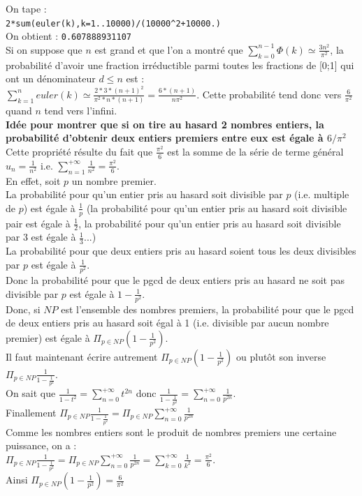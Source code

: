 \documentclass[a4paper,11pt]{book}
\begin{document}
\begin{enumerate}
On tape :\\
{\tt 2*sum(euler(k),k=1..10000)/(10000\verb|^|2+10000.)}\\
On obtient :
{\tt 0.607888931107}\\
Si on suppose que $n$ est grand et que l'on a montr\'e que 
$\sum_{k=0}^{n-1}\Phi(k)\simeq \frac{3n^2}{\pi^2}$, la probabilit\'e d'avoir une
fraction irr\'eductible parmi toutes 
les fractions de [0;1] qui ont un d\'enominateur $d\leq n$ est :\\
$\sum_{k=1}^n euler(k)\simeq \frac{2*3*(n+1)^2}{\pi^2*n*(n+1)}=\frac{6*(n+1)}{n\pi^2}$.
Cette probabilit\'e tend donc vers $\frac{6}{\pi^2}$ quand $n$ tend vers 
l'infini.\\
{\bf Id\'ee pour montrer que si on tire au hasard 2 nombres entiers, la 
probabilit\'e d'obtenir deux entiers premiers entre eux est \'egale \`a 
$6/\pi^2$}\\
Cette propri\'et\'e r\'esulte du fait que $\frac{\pi^2}{6}$ est la somme de la 
s\'erie de terme g\'en\'eral $u_n=\frac{1}{n^2}$ i.e.
$\sum_{n=1}^{+\infty}\frac{1}{n^2}=\frac{\pi^2}{6}$.\\
 En effet, soit $p$ un nombre premier.\\
La probabilit\'e pour qu'un entier pris au hasard soit divisible par $p$ (i.e. 
multiple de $p$) est \'egale \`a $\frac{1}{p}$ (la probabilit\'e
pour qu'un entier pris au hasard soit divisible pair est \'egale \`a 
$\frac{1}{2}$, la probabilit\'e pour qu'un entier pris au hasard soit 
divisible par $3$ est \'egale \`a $\frac{1}{3}$...)\\
La probabilit\'e pour que deux entiers pris au hasard soient tous les deux 
divisibles par $p$ est \'egale \`a $\frac{1}{p^2}$. \\
Donc la probabilit\'e pour que le pgcd de deux entiers pris au 
hasard ne soit pas divisible par $p$ est \'egale \`a $1-\frac{1}{p^2}$.\\
Donc, si $NP$ est l'ensemble des nombres premiers, la probabilit\'e pour que le 
pgcd de deux entiers pris au hasard soit \'egal \`a 1 (i.e. divisible par aucun 
nombre premier) est \'egale \`a $\Pi_{p\in NP}(1-\frac{1}{p^2})$.\\
Il faut maintenant \'ecrire autrement $\Pi_{p\in NP}(1-\frac{1}{p^2})$ ou 
plut\^ot son inverse $\Pi_{p\in NP}\frac{1}{1-\frac{1}{p^2}}$.\\
On sait que $\frac{1}{1-t^2}=\sum_{n=0}^{+\infty}t^{2n}$ donc
$\frac{1}{1-\frac{1}{p^2}}=\sum_{n=0}^{+\infty}\frac{1}{p^{2n}}$.\\
Finallement $\Pi_{p\in NP}\frac{1}{1-\frac{1}{p^2}}=\Pi_{p\in NP}\sum_{n=0}^{+\infty}\frac{1}{p^{2n}}$\\
Comme les nombres entiers sont le produit de nombres premiers \a une certaine 
puissance, on a :\\
$\Pi_{p\in NP}\frac{1}{1-\frac{1}{p^2}}=\Pi_{p\in NP}\sum_{n=0}^{+\infty}\frac{1}{p^{2n}} =\sum_{k=0}^{+\infty}\frac{1}{k^{2}}=\frac{\pi^2}{6}$.\\
Ainsi $\Pi_{p\in NP}(1-\frac{1}{p^2})=\frac{6}{\pi^2}$
\end{enumerate}
\end{document}
